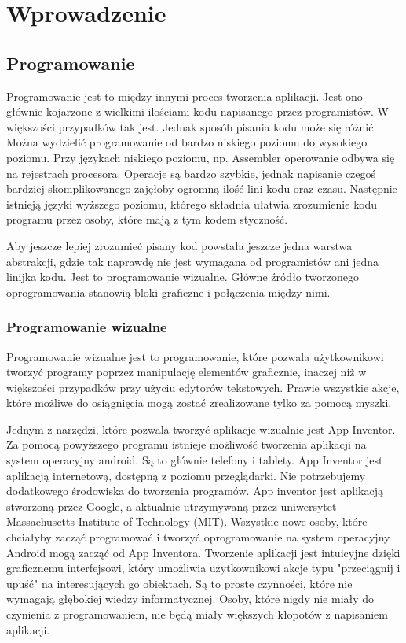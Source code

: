 \chapter{Wprowadzenie}
\label{c1}

\section{Programowanie}
\label{c11}

Programowanie jest to między innymi proces tworzenia aplikacji. Jest ono głównie kojarzone z wielkimi ilościami kodu napisanego przez programistów. W większości przypadków tak jest. Jednak sposób pisania kodu może się różnić. Można wydzielić programowanie od bardzo niskiego poziomu do wysokiego poziomu. Przy językach niskiego poziomu, np. Assembler operowanie odbywa się na rejestrach procesora. Operacje są bardzo szybkie, jednak napisanie czegoś bardziej skomplikowanego zajęłoby ogromną ilość lini kodu oraz czasu. Następnie istnieją języki wyższego poziomu, którego składnia ułatwia zrozumienie kodu programu przez osoby, które mają z tym kodem styczność.

Aby jeszcze lepiej zrozumieć pisany kod powstała jeszcze jedna warstwa abstrakcji, gdzie tak naprawdę nie jest wymagana od programistów ani jedna linijka kodu. Jest to programowanie wizualne. Główne źródło tworzonego oprogramowania stanowią bloki graficzne i połączenia między nimi.


\subsection{Programowanie wizualne}
\label{c111}
Programowanie wizualne jest to programowanie, które pozwala użytkownikowi tworzyć programy poprzez manipulację elementów graficznie, inaczej niż w większości przypadków przy użyciu edytorów tekstowych. Prawie wszystkie akcje, które możliwe do osiągnięcia mogą zostać zrealizowane tylko za pomocą myszki.

Jednym z narzędzi, które pozwala tworzyć aplikacje wizualnie jest App Inventor. Za pomocą powyższego programu istnieje możliwość tworzenia aplikacji na system operacyjny android. Są to głównie telefony i tablety. App Inventor jest aplikacją internetową, dostępną z poziomu przeglądarki. Nie potrzebujemy dodatkowego środowiska do tworzenia programów. App inventor jest aplikacją stworzoną przez Google, a aktualnie utrzymywaną przez uniwersytet Massachusetts Institute of Technology (MIT). Wszystkie nowe osoby, które chciałyby zacząć programować i tworzyć oprogramowanie na system operacyjny Android mogą zacząć od App Inventora. Tworzenie aplikacji jest intuicyjne dzięki graficznemu interfejsowi, który umożliwia użytkownikowi akcje typu "przeciągnij i upuść" na interesujących go obiektach.\cite{wiki:appinventor} Są to proste czynności, które nie wymagają głębokiej wiedzy informatycznej. Osoby, które nigdy nie miały do czynienia z programowaniem, nie będą miały większych kłopotów z napisaniem aplikacji.

